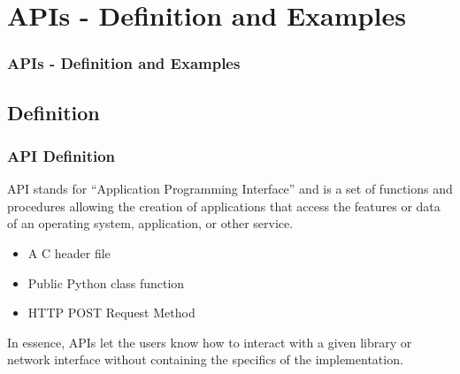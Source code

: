 \documentclass[t]{beamer}
\begin{document}
\section{APIs - Definition and Examples}

\begin{frame}
  \frametitle{APIs - Definition and Examples}
  \tableofcontents[currentsection]
  \vspace{200pt}  %
\end{frame}

\subsection{Definition}
\begin{frame}
  \frametitle{API Definition}

  API stands for ``Application Programming Interface'' and is a set of
  functions and procedures allowing the creation of applications that access
  the features or data of an operating system, application, or other service.


  \begin{examples}
    \begin{itemize}
    \item A C header file
    \item Public Python class function
    \item HTTP POST Request Method
    \end{itemize}
  \end{examples}

  In essence, APIs let the users know how to interact with a given library or
  network interface without containing the specifics of the implementation.


\end{frame}
\end{document}
